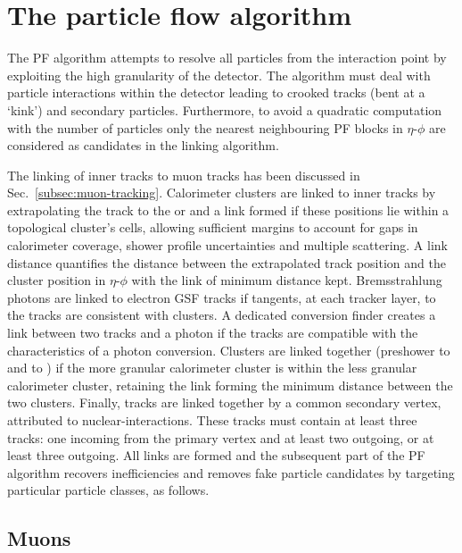 \section{The particle flow algorithm}

The PF algorithm attempts to resolve all particles from the interaction point
by exploiting the high granularity of the \CMS detector. The algorithm must
deal with particle interactions within the detector leading to crooked tracks
(bent at a `kink') and secondary particles. Furthermore, to avoid a quadratic
computation with the number of particles only the nearest neighbouring PF
blocks in $\eta$-$\phi$ are considered as candidates in the linking algorithm.

The linking of inner tracks to muon tracks has been discussed in
{Sec.~\ref{subsec:muon-tracking}}. Calorimeter clusters are linked to inner
tracks by extrapolating the track to the \ECAL or \HCAL and a link formed if
these positions lie within a topological cluster's cells, allowing sufficient
margins to account for gaps in calorimeter coverage, shower profile
uncertainties and multiple scattering. A link distance quantifies the distance
between the extrapolated track position and the cluster position in
$\eta$-$\phi$ with the link of minimum distance kept. Bremsstrahlung photons
are linked to electron GSF tracks if tangents, at each tracker layer, to the
tracks are consistent with \ECAL clusters. A dedicated conversion finder
creates a link between two tracks and a photon if the tracks are compatible
with the characteristics of a photon conversion. Clusters are linked together
(preshower to \ECAL and \ECAL to \HCAL) if the more granular calorimeter
cluster is within the less granular calorimeter cluster, retaining the link
forming the minimum distance between the two clusters. Finally, tracks are
linked together by a common secondary vertex, attributed to
nuclear-interactions. These tracks must contain at least three tracks: one
incoming from the primary vertex and at least two outgoing, or at least three
outgoing. All links are formed and the subsequent part of the PF algorithm
recovers inefficiencies and removes fake particle candidates by targeting
particular particle classes, as follows.

    
\subsection{Muons}

